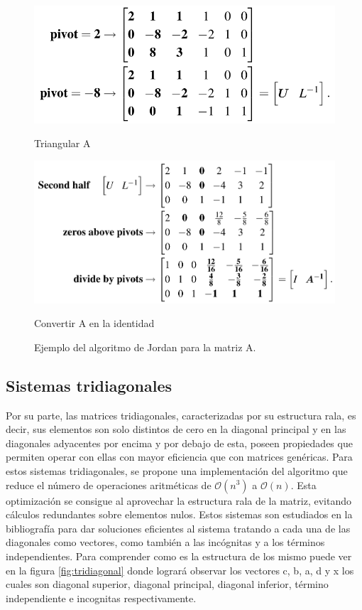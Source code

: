 \begin{figure}[]
    \centering
    \begin{minipage}{0.3\linewidth}
        \includegraphics[width=\linewidth]{img/inversa_1.png}
        \caption{Triangular A}
    \end{minipage}
  \begin{minipage}{0.3\linewidth}
      \includegraphics[width=\linewidth]{img/inversa_2.png}
      \caption{Convertir A en la identidad}
  \end{minipage}
  \caption{Ejemplo del algoritmo de Jordan para la matriz A.}
  \label{fig:jordan_ejemplo}
\end{figure}



\subsection{Sistemas tridiagonales}
\label{sec:tridiagonal}

Por su parte, las matrices tridiagonales, caracterizadas por su estructura rala, es decir, sus elementos son solo distintos de cero en la diagonal principal y en las diagonales adyacentes por encima y por debajo de esta, poseen propiedades que permiten operar con ellas con mayor eficiencia que con matrices genéricas. Para estos sistemas tridiagonales, se propone una implementación del algoritmo que reduce el número de operaciones aritméticas de $\mathcal{O}(n^3)$ a $\mathcal{O}(n)$. Esta optimización se consigue al aprovechar la estructura rala de la matriz, evitando cálculos redundantes sobre elementos nulos. Estos sistemas son estudiados en la bibliografía \cite{Recipes07} para dar soluciones eficientes al sistema tratando a cada una de las diagonales como vectores, como también a las incógnitas y a los términos independientes. Para comprender como es la estructura de los mismo puede ver en la figura \ref{fig:tridiagonal} donde logrará observar los vectores c, b, a, d y x los cuales son diagonal superior, diagonal principal, diagonal inferior, término independiente e incognitas respectivamente.  

